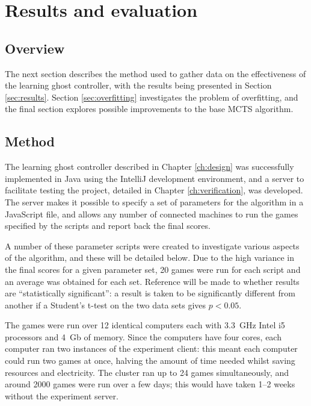 \chapter{Results and evaluation}
\label{ch:results}

\section{Overview}

The next section describes the method used to gather data on the effectiveness of the learning ghost controller, with the results being presented in Section \ref{sec:results}.  Section \ref{sec:overfitting} investigates the problem of overfitting, and the final section explores possible improvements to the base MCTS algorithm.

\section{Method}

The learning ghost controller described in Chapter \ref{ch:design} was successfully implemented in Java using the IntelliJ development environment, and a server to facilitate testing the project, detailed in Chapter \ref{ch:verification}, was developed.  The server makes it possible to specify a set of parameters for the algorithm in a JavaScript file, and allows any number of connected machines to run the games specified by the scripts and report back the final scores.

A number of these parameter scripts were created to investigate various aspects of the algorithm, and these will be detailed below.  Due to the high variance in the final scores for a given parameter set, 20 games were run for each script and an average was obtained for each set.  Reference will be made to whether results are ``statistically significant'': a result is taken to be significantly different from another if a Student's t-test on the two data sets gives $p < 0.05$.

The games were run over 12 identical computers each with 3.3~GHz Intel i5 processors and 4~Gb of memory.  Since the computers have four cores, each computer ran two instances of the experiment client: this meant each computer could run two games at once, halving the amount of time needed whilst saving resources and electricity.  The cluster ran up to 24 games simultaneously, and around 2000 games were run over a few days; this would have taken 1--2 weeks without the experiment server.

